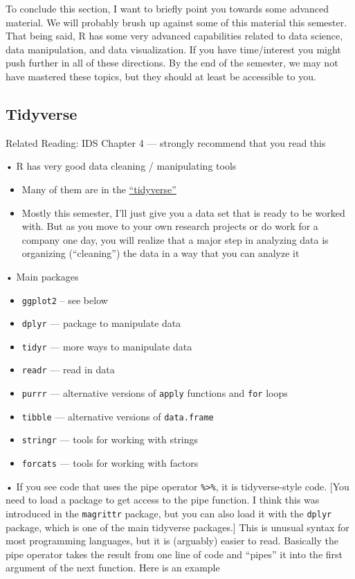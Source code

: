 \documentclass[
  letterpaper,
  DIV=11,
  numbers=noendperiod]{scrreprt}
\begin{document}
To conclude this section, I want to briefly point you towards some
advanced material. We will probably brush up against some of this
material this semester. That being said, R has some very advanced
capabilities related to data science, data manipulation, and data
visualization. If you have time/interest you might push further in all
of these directions. By the end of the semester, we may not have
mastered these topics, but they should at least be accessible to you.

\subsection{Tidyverse}\label{tidyverse}

Related Reading: IDS Chapter 4 --- strongly recommend that you read this

• R has very good data cleaning / manipulating tools

\begin{itemize}
\item
  Many of them are in the
  \href{https://www.tidyverse.org/}{``tidyverse''}
\item
  Mostly this semester, I'll just give you a data set that is ready to
  be worked with. But as you move to your own research projects or do
  work for a company one day, you will realize that a major step in
  analyzing data is organizing (``cleaning'') the data in a way that you
  can analyze it
\end{itemize}

• Main packages

\begin{itemize}
\item
  \texttt{ggplot2} -- see below
\item
  \texttt{dplyr} --- package to manipulate data
\item
  \texttt{tidyr} --- more ways to manipulate data
\item
  \texttt{readr} --- read in data
\item
  \texttt{purrr} --- alternative versions of \texttt{apply} functions
  and \texttt{for} loops
\item
  \texttt{tibble} --- alternative versions of \texttt{data.frame}
\item
  \texttt{stringr} --- tools for working with strings
\item
  \texttt{forcats} --- tools for working with factors
\end{itemize}

• If you see code that uses the pipe operator
\texttt{\%\textgreater{}\%}, it is tidyverse-style code. {[}You need to
load a package to get access to the pipe function. I think this was
introduced in the \texttt{magrittr} package, but you can also load it
with the \texttt{dplyr} package, which is one of the main tidyverse
packages.{]} This is unusual syntax for most programming languages, but
it is (arguably) easier to read. Basically the pipe operator takes the
result from one line of code and ``pipes'' it into the first argument of
the next function. Here is an example
\end{document}

